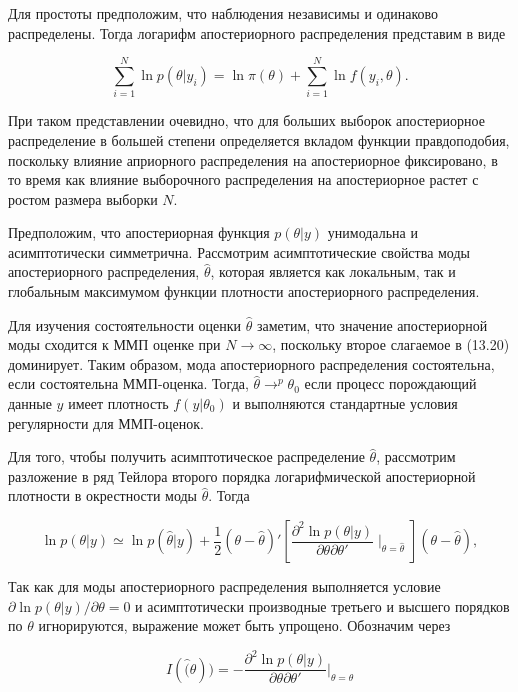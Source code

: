 Для простоты предположим, что наблюдения независимы и одинаково распределены. Тогда логарифм апостериорного распределения представим в виде

\begin{equation}
\sum^{N}_{i=1}\ln {p(\theta|y_i)}=\ln \pi(\theta)+\sum^{N}_{i=1}\ln {f(y_i,\theta)}.
\end{equation}

При таком представлении очевидно, что для больших выборок апостериорное распределение в большей степени определяется вкладом функции правдоподобия, поскольку влияние априорного распределения на апостериорное фиксировано, в то время как влияние выборочного распределения на апостериорное растет с ростом размера выборки $N$. 

Предположим, что апостериорная функция $p(\theta|y)$ унимодальна и асимптотически симметрична. Рассмотрим асимптотические свойства моды апостериорного распределения, $\hat{\theta}$, которая является как локальным, так и глобальным максимумом функции плотности апостериорного распределения.

Для изучения состоятельности оценки $\hat{\theta}$ заметим, что значение апостериорной моды сходится к ММП оценке при $N{\rightarrow}\infty$, поскольку  второе слагаемое в (13.20) доминирует. Таким образом, мода апостериорного распределения состоятельна, если состоятельна ММП-оценка. Тогда, $\hat{\theta}{\rightarrow}^{p}\theta_0$ если  процесс порождающий данные $y$ имеет плотность $f(y|\theta_0)$ и выполняются стандартные условия регулярности для ММП-оценок. 

Для того, чтобы получить асимптотическое распределение $\hat{\theta}$, рассмотрим разложение в ряд Тейлора второго порядка логарифмической апостериорной плотности в окрестности моды $\hat{\theta}$. Тогда

\begin{equation}
\ln {p(\theta|y){\simeq}}\ln {p(\hat{\theta}|y)}+\dfrac{1}{2}(\theta-\hat{\theta})'\left[\dfrac{\partial^{2}\ln {p(\theta|y)}}{\partial\theta\partial\theta'}{\mid}_{\theta=\hat{\theta}}\right](\theta-\hat{\theta}), 
\end{equation}

Так как для моды апостериорного распределения выполняется условие $\partial{\ln }p(\theta|y)/\partial\theta=0$ и асимптотически  производные третьего и высшего порядков по $\theta$ игнорируются, выражение может быть упрощено. Обозначим через

\[
I(\hat(\theta))=-\dfrac{\partial^{2}\ln {p(\theta|y)}}{\partial\theta\partial\theta'}|_{\theta=\hat{\theta}}
\]

